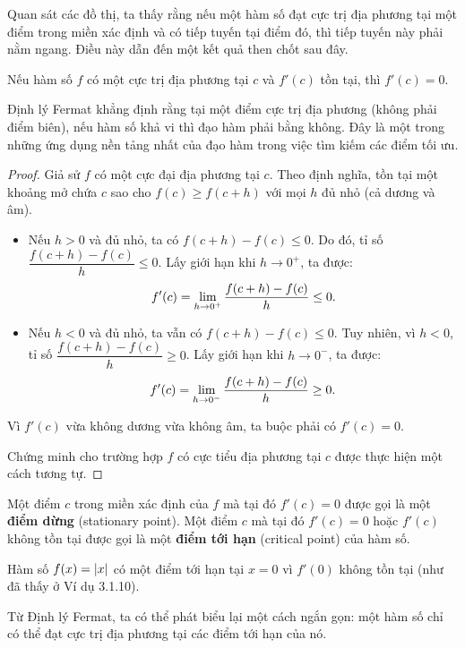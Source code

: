 Quan sát các đồ thị, ta thấy rằng nếu một hàm số đạt cực trị địa phương tại một điểm trong miền xác định và có tiếp tuyến tại điểm đó, thì tiếp tuyến này phải nằm ngang. Điều này dẫn đến một kết quả then chốt sau đây.

\begin{theorem}
\label{thm:fermat}
Nếu hàm số $f$ có một cực trị địa phương tại $c$ và $f'(c)$ tồn tại, thì $f'(c) = 0$.
\end{theorem}

Định lý Fermat khẳng định rằng tại một điểm cực trị địa phương (không phải điểm biên), nếu hàm số khả vi thì đạo hàm phải bằng không. Đây là một trong những ứng dụng nền tảng nhất của đạo hàm trong việc tìm kiếm các điểm tối ưu.

\begin{proof}
Giả sử $f$ có một cực đại địa phương tại $c$. Theo định nghĩa, tồn tại một khoảng mở chứa $c$ sao cho $f(c) \ge f(c+h)$ với mọi $h$ đủ nhỏ (cả dương và âm).
\begin{itemize}
    \item Nếu $h > 0$ và đủ nhỏ, ta có $f(c+h) - f(c) \le 0$. Do đó, tỉ số $\dfrac{f(c+h) - f(c)}{h} \le 0$. Lấy giới hạn khi $h \to 0^+$, ta được:
    $$f'(c) = \lim\limits_{h \to 0^+} \dfrac{f(c+h) - f(c)}{h} \le 0.$$
    \item Nếu $h < 0$ và đủ nhỏ, ta vẫn có $f(c+h) - f(c) \le 0$. Tuy nhiên, vì $h < 0$, tỉ số $\dfrac{f(c+h) - f(c)}{h} \ge 0$. Lấy giới hạn khi $h \to 0^-$, ta được:
    $$f'(c) = \lim\limits_{h \to 0^-} \dfrac{f(c+h) - f(c)}{h} \ge 0.$$
\end{itemize}
Vì $f'(c)$ vừa không dương vừa không âm, ta buộc phải có $f'(c) = 0$.

Chứng minh cho trường hợp $f$ có cực tiểu địa phương tại $c$ được thực hiện một cách tương tự.
\end{proof}

Một điểm $c$ trong miền xác định của $f$ mà tại đó $f'(c)=0$ được gọi là một \textbf{điểm dừng} (stationary point). Một điểm $c$ mà tại đó $f'(c)=0$ hoặc $f'(c)$ không tồn tại được gọi là một \textbf{điểm tới hạn} (critical point) của hàm số.

\begin{example}\label{ex:abs-critical-point}
Hàm số $f(x) = \left\lvert x \right\rvert$ có một điểm tới hạn tại $x=0$ vì $f'(0)$ không tồn tại (như đã thấy ở Ví dụ 3.1.10).
\end{example}

Từ Định lý Fermat, ta có thể phát biểu lại một cách ngắn gọn: một hàm số chỉ có thể đạt cực trị địa phương tại các điểm tới hạn của nó.


